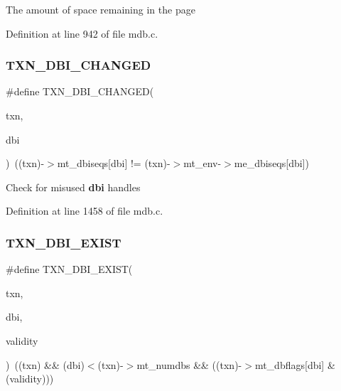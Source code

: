 The amount of space remaining in the page 

Definition at line 942 of file mdb.\+c.

\mbox{\label{group__internal_ga1d4c1bd5bcb0a3cf8d281fa4868d5b8d}} 
\subsubsection{\texorpdfstring{T\+X\+N\+\_\+\+D\+B\+I\+\_\+\+C\+H\+A\+N\+G\+ED}{TXN\_DBI\_CHANGED}}
{\footnotesize\ttfamily \#define T\+X\+N\+\_\+\+D\+B\+I\+\_\+\+C\+H\+A\+N\+G\+ED(\begin{DoxyParamCaption}\item[{}]{txn,  }\item[{}]{dbi }\end{DoxyParamCaption})~((txn)-\/$>$mt\+\_\+dbiseqs\mbox{[}dbi\mbox{]} != (txn)-\/$>$mt\+\_\+env-\/$>$me\+\_\+dbiseqs\mbox{[}dbi\mbox{]})}

Check for misused {\bfseries dbi} handles 

Definition at line 1458 of file mdb.\+c.

\mbox{\label{group__internal_ga595c1d82481e8c361da5b32f1dbe1ffd}} 
\subsubsection{\texorpdfstring{T\+X\+N\+\_\+\+D\+B\+I\+\_\+\+E\+X\+I\+ST}{TXN\_DBI\_EXIST}}
{\footnotesize\ttfamily \#define T\+X\+N\+\_\+\+D\+B\+I\+\_\+\+E\+X\+I\+ST(\begin{DoxyParamCaption}\item[{}]{txn,  }\item[{}]{dbi,  }\item[{}]{validity }\end{DoxyParamCaption})~((txn) \&\& (dbi)$<$(txn)-\/$>$mt\+\_\+numdbs \&\& ((txn)-\/$>$mt\+\_\+dbflags\mbox{[}dbi\mbox{]} \& (validity)))}

